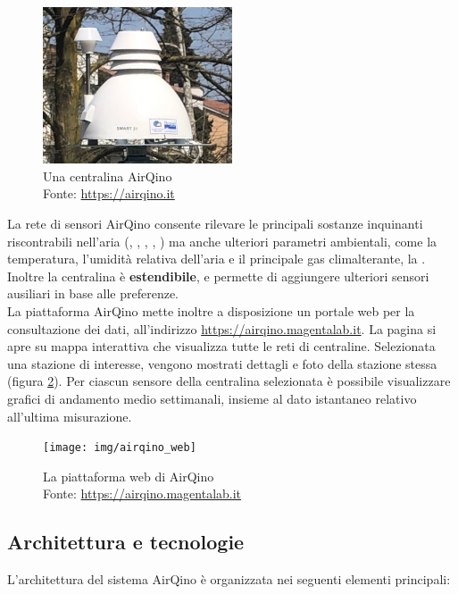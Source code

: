 \begin{figure}[H]
\centering
\captionsetup{justification=centering}
\includegraphics[width=0.50\textwidth,height=\textheight,keepaspectratio]{img/airqino_stazione}
\caption{Una centralina AirQino\\Fonte: \url{https://airqino.it}}
\label{fig:airqino_stazione}
\end{figure}

La rete di sensori AirQino consente rilevare le principali sostanze inquinanti riscontrabili nell’aria (, , , , ) ma anche ulteriori parametri ambientali, come la temperatura, l'umidità relativa dell’aria e il principale gas climalterante, la .
Inoltre la centralina è \textbf{estendibile}, e permette di aggiungere ulteriori sensori ausiliari in base alle preferenze.\\

La piattaforma AirQino mette inoltre a disposizione un portale web per la consultazione dei dati, all'indirizzo \url{https://airqino.magentalab.it}. La pagina si apre su mappa interattiva che visualizza tutte le reti di centraline. Selezionata una stazione di interesse, vengono mostrati dettagli e foto della stazione stessa (figura \ref{fig:airqino_web}). Per ciascun sensore della centralina selezionata è possibile visualizzare grafici di andamento medio settimanali, insieme al dato istantaneo relativo all'ultima misurazione. \cite{airqino}

\begin{figure}[H]
\centering
\captionsetup{justification=centering}
\texttt{[image: img/airqino\_web]}
\caption{La piattaforma web di AirQino\\Fonte: \url{https://airqino.magentalab.it}}
\label{fig:airqino_web}
\end{figure}

\subsection{Architettura e tecnologie}\label{ssec:airqino-architettura}
L'architettura del sistema AirQino è organizzata nei seguenti elementi principali:

